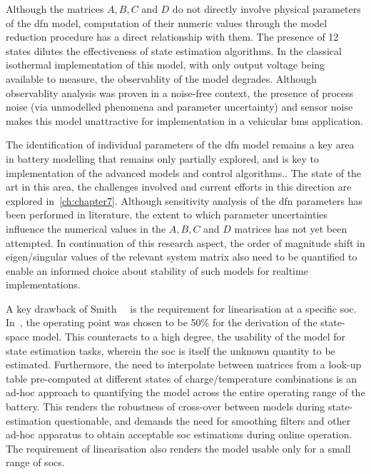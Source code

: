 Although the matrices $A, B, C$ and $D$ do not directly involve physical parameters of the
\gls{dfn} model, computation of their numeric values through the model reduction procedure has a
direct relationship with them. The presence of 12 states dilutes the effectiveness of state
estimation algorithms. In the classical isothermal implementation of this model, with only output
voltage being available to measure, the observablity of the model degrades. Although observablity
analysis was proven in a noise-free context, the presence of process noise (via unmodelled phenomena
and parameter uncertainty) and sensor noise makes this model unattractive for implementation in a
vehicular \gls{bms} application.

The identification of individual parameters of the \gls{dfn} model remains a key area in battery
modelling that remains only partially explored, and is key to implementation of the advanced models
and control algorithms.. The state of the
art in this area, the challenges involved and current efforts in this direction are explored
in~\cref{ch:chapter7}. Although sensitivity analysis of the \gls{dfn} parameters has been performed
in literature,  the extent to which parameter uncertainties influence the
numerical values in the $A, B, C$ and $D$ matrices has not yet been attempted. In continuation of
this research aspect, the order of magnitude shift in eigen/singular values of the relevant system
matrix also need to be quantified to enable an informed choice about stability of such models for
realtime implementations.

A key drawback of Smith~\etal{}~\cite{Smith2007} is the requirement for linearisation at a specific
\gls{soc}. In~\cite{Smith2007}, the operating point was chosen to be 50\% for the derivation of the
state-space model. This counteracts to a high degree, the usability of the model for state
estimation tasks, wherein the \gls{soc} is itself the unknown quantity to be estimated. Furthermore,
the need to interpolate between matrices from a look-up table pre-computed at different states of
charge/temperature combinations is an ad-hoc approach to quantifying the model across the entire
operating range of the battery. This renders the robustness of cross-over between models during
state-estimation questionable, and demands the need for smoothing filters and other ad-hoc apparatus
to obtain acceptable \gls{soc} estimations during online operation. The requirement of linearisation
also renders the model usable only for a small range of \gls{soc}s.


